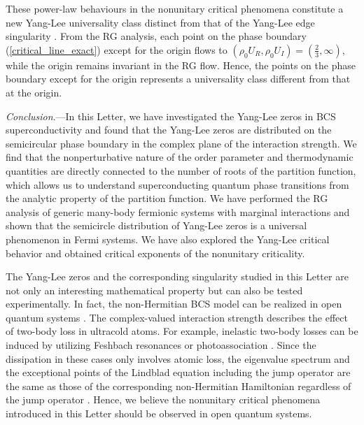 \documentclass[aps,prl,twocolumn,superscriptaddress]{revtex4-1}
\begin{document}
These power-law behaviours in the nonunitary
critical phenomena constitute a new Yang-Lee universality class distinct from that of the Yang-Lee edge singularity \cite{Fisher:1978vn}.
From the RG analysis, each point on the phase
boundary (\ref{critical_line_exact}) except for the origin flows
to $(\rho_0U_R,\rho_0U_I)=(\frac{2}{3},\infty)$, while the origin remains invariant in
the RG flow. Hence, the points on the phase boundary except for the
origin represents a universality class different from that at the
origin.

\emph{Conclusion}.---In this Letter, we have investigated the Yang-Lee
zeros in BCS superconductivity and found that the Yang-Lee zeros are distributed
on the semicircular phase boundary in the complex plane of the interaction
strength. We find that the nonperturbative nature of the order parameter and thermodynamic quantities are directly connected to the number of roots of the partition function, which allows us to understand superconducting quantum phase transitions from the analytic property of the partition function. We have performed the RG analysis
of generic many-body fermionic systems with marginal interactions and shown that the semicircle distribution of Yang-Lee zeros is a universal phenomenon in Fermi systems. %
We have also explored the Yang-Lee critical behavior and obtained critical exponents of the nonunitary criticality.

The Yang-Lee zeros and the corresponding singularity studied in this
Letter are not only an interesting mathematical property but can also be tested experimentally. In fact, the non-Hermitian BCS model can be realized in
open quantum systems \cite{Yamamoto2019,PhysRevA.103.013724}. The
complex-valued interaction strength describes the effect of two-body
loss in ultracold atoms. For example, inelastic two-body losses can
be induced by utilizing Feshbach resonances \cite{PhysRevLett.115.265301,PhysRevLett.115.265302,Zhang2015}
or photoassociation \cite{doi:10.1126/sciadv.1701513,https://doi.org/10.48550/arxiv.2205.13162}.
Since the dissipation in these cases only involves atomic loss, the eigenvalue spectrum and the exceptional points of the Lindblad equation including the jump operator are the same as those of the corresponding non-Hermitian Hamiltonian regardless of the jump operator \cite{PhysRevLett.126.110404}. Hence, we believe the nonunitary critical phenomena introduced in this Letter should be observed in open quantum systems. %
\end{document}
